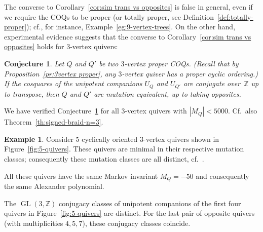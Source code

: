 \documentclass[11pt, letterpaper]{amsart}
\newcommand{\hide}[1]{}
\newtheorem{conjecture}[theorem]{Conjecture}
\theoremstyle{definition}
\newtheorem{remark}[theorem]{Remark}
\newtheorem{example}[theorem]{Example}
\numberwithin{equation}{section}
\def\ZZ{{\mathbb Z}}
\def\GL{{\operatorname{GL}}}
\begin{document}
The converse to Corollary~\ref{cor:sim trans vs opposites} is false in general, 
even if we require the COQs to be proper (or totally proper, see Definition~\ref{def:totally-proper});
cf., for instance, Example~\ref{eg:9-vertex-trees}.
\hide{
\begin{remark}
For COQs $Q$ and $Q'$, consider the following statements:
\begin{enumerate}
\item[$(1)$] $Q$ and $Q'$ are related to each other by wiggles and proper mutations;
\item[$(2)$] the cosquares of their unipotent companions are conjugate in $\GL(n,\ZZ)$.
\end{enumerate}
By Corollary~\ref{cor:proper-mutations-preserve-cosquare}, (1)$\Rightarrow$(2). 
The converse implication $(2)\Rightarrow(1)$ is false in general, 
even if we require $Q$ and $Q'$ to be proper (or totally proper, see Definition~\ref{def:totally-proper}) 
and even if we allow replacing $Q$ or $Q'$ by their opposite COQ. 
See, e.g., Example~\ref{eg:9-vertex-trees}.
\end{remark}
}%
On the other hand, experimental evidence suggests that the converse to
Corollary~\ref{cor:sim trans vs opposites} holds for 3-vertex quivers:

\begin{conjecture}
\label{conj:3 vert mu equiv}
Let $Q$ and $Q'$ be two $3$-vertex proper COQs.
(Recall that by Proposition~\ref{pr:3vertex proper}, any $3$-vertex quiver has a proper cyclic ordering.)
If the cosquares of the unipotent companions $U_Q$ and $U_{Q'}$ are conjugate over~$\ZZ$ up to transpose,
then  $Q$ and $Q'$ are mutation equivalent, up to taking opposites. 
\end{conjecture}

We have verified Conjecture~\ref{conj:3 vert mu equiv} for all 3-vertex quivers with $|M_Q| < 5000$.
Cf.\ also Theorem~\ref{th:signed-braid-n=3}. 

\begin{example}
\label{eg:frob 3 vert}
Consider 5 cyclically oriented $3$-vertex quivers %
shown in Figure~\ref{fig:5-quivers}. 
These quivers are minimal in their respective mutation classes;
consequently these mutation classes are all distinct, cf.~\cite{BBH}. 

All these quivers have the same Markov invariant $M_Q=-50$ and consequently the same Alexander polynomial. 

The $\GL(3,\ZZ)$ conjugacy classes of unipotent companions of the first four quivers in Figure~\ref{fig:5-quivers}
are distinct. 
For the last pair of opposite quivers (with multiplicities ${4,5,7}$), these conjugacy classes coincide. 
\end{example}
\end{document}
